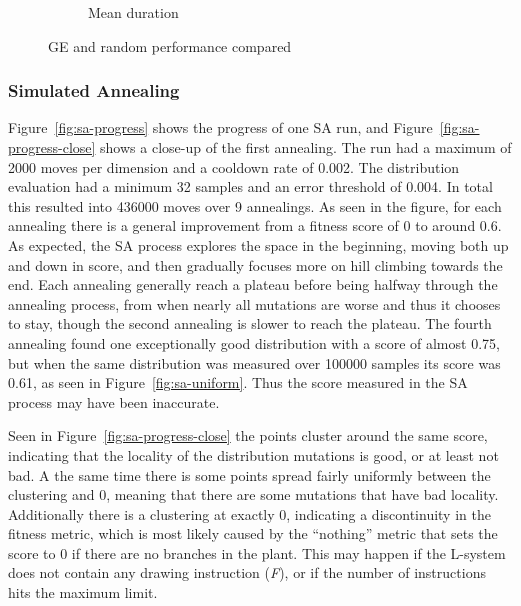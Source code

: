 \begin{figure}
\begin{subfigure}{0.4\textwidth}
        \caption{Mean duration}
        \label{fig:ge-random-duration}
    \end{subfigure}
    \caption{GE and random performance compared}
\end{figure}

\subsubsection{Simulated Annealing}

Figure~\ref{fig:sa-progress} shows the progress of one SA run, and Figure~\ref{fig:sa-progress-close} shows a close-up of the first annealing.
The run had a maximum of 2000 moves per dimension and a cooldown rate of 0.002.
The distribution evaluation had a minimum 32 samples and an error threshold of 0.004.
In total this resulted into 436000 moves over 9 annealings.
As seen in the figure, for each annealing there is a general improvement from a fitness score of 0 to around 0.6.
As expected, the SA process explores the space in the beginning, moving both up and down in score, and then gradually focuses more on hill climbing towards the end.
Each annealing generally reach a plateau before being halfway through the annealing process, from when nearly all mutations are worse and thus it chooses to stay, though the second annealing is slower to reach the plateau.
The fourth annealing found one exceptionally good distribution with a score of almost 0.75, but when the same distribution was measured over 100000 samples its score was 0.61, as seen in Figure~\ref{fig:sa-uniform}.
Thus the score measured in the SA process may have been inaccurate.

Seen in Figure~\ref{fig:sa-progress-close} the points cluster around the same score, indicating that the locality of the distribution mutations is good, or at least not bad.
A the same time there is some points spread fairly uniformly between the clustering and 0, meaning that there are some mutations that have bad locality.
Additionally there is a clustering at exactly 0, indicating a discontinuity in the fitness metric, which is most likely caused by the ``nothing'' metric that sets the score to 0 if there are no branches in the plant.
This may happen if the L-system does not contain any drawing instruction (\textit{F}), or if the number of instructions hits the maximum limit.

